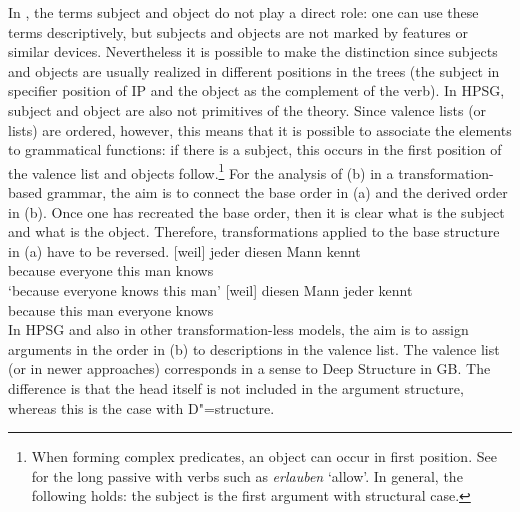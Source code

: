 In \gbt, the terms subject and object do not play a direct role: one can use
these terms descriptively, but subjects and objects are not marked by features or similar
devices. Nevertheless it is possible to make the distinction since subjects and objects are usually
realized in different positions in the trees (the subject in specifier position of IP and the object as the complement of the verb). In HPSG, subject and object
are also not primitives of the theory. Since valence lists (or \argst lists) are ordered, however,
this means that it is possible to associate the \argst elements to grammatical functions:
if there is a subject, this occurs in the first position of the valence list and objects follow.\footnote{%
	When forming complex predicates, an object can occur in first position. See  for the long passive with verbs such as \emph{erlauben}
          `allow'. In general, the following holds: the subject is the first argument with structural case.%
} 
For the analysis of (b)  in a transformation-based grammar, the aim is to connect the base order in (a) and the derived order in (b).
Once one has recreated the base order, then it is clear what is the subject and what is the object. Therefore, transformations applied to the base
structure in (a) have to be reversed.
\eal
\ex 
\gll {}[weil] jeder diesen Mann kennt\\
	 {}\spacebr{}because everyone this man knows\\
\glt `because everyone knows this man'
\ex 
\gll {}[weil] diesen Mann jeder kennt\\
	 {}\spacebr{}because this man everyone knows\\
\zl
In HPSG and also in other transformation-less models, the aim is to assign arguments in the order in (b) to descriptions
in the valence list. The valence list (or \argst in newer approaches) corresponds in a sense to Deep Structure in GB.
The difference is that the head itself is not included in the argument structure, whereas this is the case with D"=structure.

